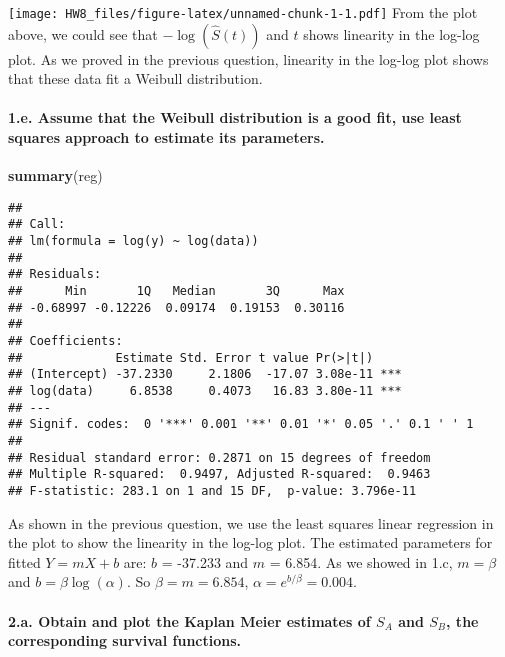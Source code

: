 \documentclass[]{article}
\newenvironment{Shaded}{\begin{snugshade}}{\end{snugshade}}
\newcommand{\KeywordTok}[1]{\textcolor[rgb]{0.13,0.29,0.53}{\textbf{#1}}}
\newcommand{\NormalTok}[1]{#1}
\let\oldparagraph\paragraph
\renewcommand{\paragraph}[1]{\oldparagraph{#1}\mbox{}}
\begin{document}
\texttt{[image: HW8\_files/figure-latex/unnamed-chunk-1-1.pdf]} From the
plot above, we could see that \(-\log(\hat{S}(t))\) and \(t\) shows
linearity in the log-log plot. As we proved in the previous question,
linearity in the log-log plot shows that these data fit a Weibull
distribution.

\hypertarget{e.-assume-that-the-weibull-distribution-is-a-good-fit-use-least-squares-approach-to-estimate-its-parameters.}{%
\paragraph{1.e. Assume that the Weibull distribution is a good fit, use
least squares approach to estimate its
parameters.}\label{e.-assume-that-the-weibull-distribution-is-a-good-fit-use-least-squares-approach-to-estimate-its-parameters.}}

\begin{Shaded}
\begin{Highlighting}[]
\KeywordTok{summary}\NormalTok{(reg)}
\end{Highlighting}
\end{Shaded}

\begin{verbatim}
## 
## Call:
## lm(formula = log(y) ~ log(data))
## 
## Residuals:
##      Min       1Q   Median       3Q      Max 
## -0.68997 -0.12226  0.09174  0.19153  0.30116 
## 
## Coefficients:
##             Estimate Std. Error t value Pr(>|t|)    
## (Intercept) -37.2330     2.1806  -17.07 3.08e-11 ***
## log(data)     6.8538     0.4073   16.83 3.80e-11 ***
## ---
## Signif. codes:  0 '***' 0.001 '**' 0.01 '*' 0.05 '.' 0.1 ' ' 1
## 
## Residual standard error: 0.2871 on 15 degrees of freedom
## Multiple R-squared:  0.9497, Adjusted R-squared:  0.9463 
## F-statistic: 283.1 on 1 and 15 DF,  p-value: 3.796e-11
\end{verbatim}

As shown in the previous question, we use the least squares linear
regression in the plot to show the linearity in the log-log plot. The
estimated parameters for fitted \(Y=mX+b\) are: \(b\) = -37.233 and
\(m\) = 6.854. As we showed in 1.c, \(m = \beta\) and
\(b = \beta \log(\alpha)\). So \(\beta = m = 6.854\),
\(\alpha = e^{b/\beta} = 0.004\).

\hypertarget{a.-obtain-and-plot-the-kaplan-meier-estimates-of-s_a-and-s_b-the-corresponding-survival-functions.}{%
\paragraph{\texorpdfstring{2.a. Obtain and plot the Kaplan Meier
estimates of \(S_A\) and \(S_B\), the corresponding survival
functions.}{2.a. Obtain and plot the Kaplan Meier estimates of S\_A and S\_B, the corresponding survival functions.}}\label{a.-obtain-and-plot-the-kaplan-meier-estimates-of-s_a-and-s_b-the-corresponding-survival-functions.}}
\end{document}

